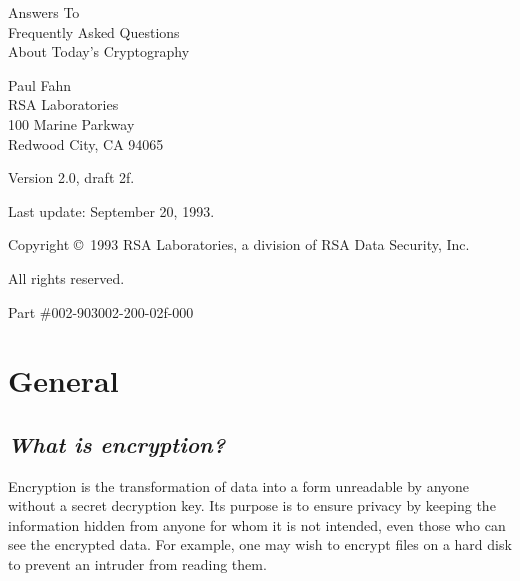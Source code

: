 %
%
%
%

\newcommand{\question}[2] { \subsection{{\it #2}} \label{#1} }


{\pagestyle{empty}
\Huge
\vspace*{16mm}
\begin{center}
{\LARGE Answers To} \\
Frequently Asked Questions \\
About Today's Cryptography 
\end{center}
\vskip 1in
\Large
\begin{center}
Paul Fahn \\
RSA Laboratories \\
100 Marine Parkway \\
Redwood City, CA  94065
\end{center}
\normalsize
\vskip 2.2in
\noindent Version 2.0, draft 2f. \par
\noindent Last update: September 20, 1993. \par
\noindent Copyright \copyright\ 1993 RSA Laboratories, a division of RSA
          Data Security, Inc. \par
\noindent All rights reserved. \par
\noindent Part \#002-903002-200-02f-000 \par
\newpage
} 

\tableofcontents
\newpage
{}

\section {General}
\question {q:aa}
{What is encryption?}
Encryption is the transformation of data into a form unreadable by anyone
without a secret decryption key. Its purpose is to ensure privacy by
keeping the information hidden from anyone for whom it is not intended, 
even those who can see the encrypted data. For example, one may wish to 
encrypt files on a hard disk to prevent an intruder from reading them. 

